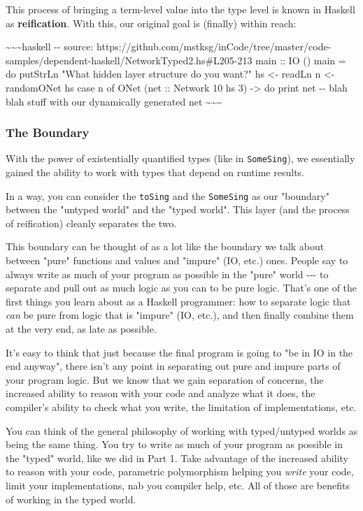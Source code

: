 \documentclass[]{article}
\begin{document}
This process of bringing a term-level value into the type level is known in
Haskell as \textbf{reification}. With this, our original goal is (finally)
within reach:

\textasciitilde{}\textasciitilde{}\textasciitilde{}haskell -\/- source:
https://github.com/mstksg/inCode/tree/master/code-samples/dependent-haskell/NetworkTyped2.hs\#L205-213
main :: IO () main = do putStrLn "What hidden layer structure do you want?" hs
\textless{}- readLn n \textless{}- randomONet hs case n of ONet (net :: Network
10 hs 3) -\textgreater{} do print net -\/- blah blah stuff with our dynamically
generated net \textasciitilde{}\textasciitilde{}\textasciitilde{}

\subsubsection{The Boundary}

With the power of existentially quantified types (like in \texttt{SomeSing}), we
essentially gained the ability to work with types that depend on runtime
results.

In a way, you can consider the \texttt{toSing} and the \texttt{SomeSing} as our
"boundary" between the "untyped world" and the "typed world". This layer (and
the process of reification) cleanly separates the two.

This boundary can be thought of as a lot like the boundary we talk about between
"pure" functions and values and "impure" (IO, etc.) ones. People say to always
write as much of your program as possible in the "pure" world -\/-\/- to
separate and pull out as much logic as you can to be pure logic. That's one of
the first things you learn about as a Haskell programmer: how to separate logic
that \emph{can} be pure from logic that is "impure" (IO, etc.), and then finally
combine them at the very end, as late as possible.

It's easy to think that just because the final program is going to "be in IO in
the end anyway", there isn't any point in separating out pure and impure parts
of your program logic. But we know that we gain separation of concerns, the
increased ability to reason with your code and analyze what it does, the
compiler's ability to check what you write, the limitation of implementations,
etc.

You can think of the general philosophy of working with typed/untyped worlds as
being the same thing. You try to write as much of your program as possible in
the "typed" world, like we did in Part 1. Take advantage of the increased
ability to reason with your code, parametric polymorphism helping you
\emph{write} your code, limit your implementations, nab you compiler help, etc.
All of those are benefits of working in the typed world.
\end{document}
